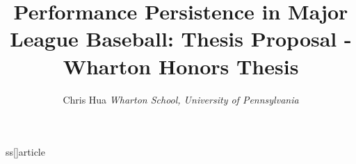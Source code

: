 ss[]{article}
\usepackage[left=1in,top=1in,right=1in,bottom=1in]{geometry}
\newcommand*{\authorfont}{\fontfamily{phv}\selectfont}
\usepackage[]{mathpazo}


  \usepackage[T1]{fontenc}
    \usepackage[utf8]{inputenc}



    \usepackage{abstract}
    \renewcommand{\abstractname}{}    %
    \renewcommand{\absnamepos}{empty} %

    \renewenvironment{abstract}
     {{%
         \setlength{\leftmargin}{0mm}
             \setlength{\rightmargin}{\leftmargin}%
               }%
                 \relax}
                  {\endlist}

                  \makeatletter
                  \def\@maketitle{%
                    \newpage
                      \let \footnote \thanks
                          {\fontsize{18}{20}\selectfont\raggedright  \setlength{\parindent}{0pt} \@title \par}%
                          }
                          \makeatother


                          

                          \setcounter{secnumdepth}{0}

                                                                                                                                  
                          
                                                    \title{Performance Persistence in Major League Baseball: Thesis Proposal - Wharton Honors Thesis  }
                          


                          \author{\Large Chris Hua\vspace{0.05in} \newline\normalsize\emph{Wharton School, University of Pennsylvania}  }


                          \date{}

                          \usepackage{titlesec}

